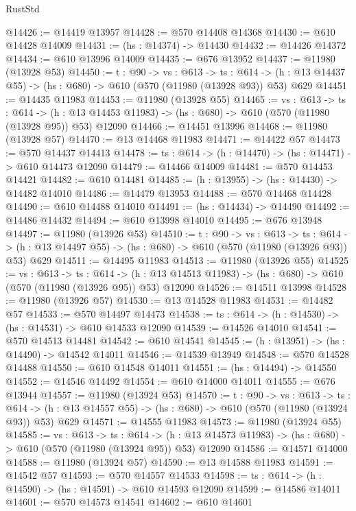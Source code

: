 \begin{lexlean}{RustStd}
\begin{coremodule}
@14426 := @14419 @13957
@14428 := @570 @14408 @14368
@14430 := @610 @14428 @14009
@14431 := (hs : @14374) -> @14430
@14432 := @14426 @14372
@14434 := @610 @13996 @14009
@14435 := @676 @13952
@14437 := @11980 (@13928 @53)
@14450 := {t : @90} ->
  {vs : @613} ->
  {ts : @614} -> (h : @13 @14437 @55) -> (hs : @680) -> @610 (@570 (@11980 (@13928 @93)) @53) @629
@14451 := @14435 @11983
@14453 := @11980 (@13928 @55)
@14465 := {vs : @613} ->
  {ts : @614} ->
  (h : @13 @14453 @11983) -> (hs : @680) -> @610 (@570 (@11980 (@13928 @95)) @53) @12090
@14466 := @14451 @13996
@14468 := @11980 (@13928 @57)
@14470 := @13 @14468 @11983
@14471 := @14422 @57
@14473 := @570 @14437 @14413
@14478 := {ts : @614} -> (h : @14470) -> (hs : @14471) -> @610 @14473 @12090
@14479 := @14466 @14009
@14481 := @570 @14453 @14421
@14482 := @610 @14481
@14485 := (h : @13955) -> (hs : @14430) -> @14482 @14010
@14486 := @14479 @13953
@14488 := @570 @14468 @14428
@14490 := @610 @14488 @14010
@14491 := (hs : @14434) -> @14490
@14492 := @14486 @14432
@14494 := @610 @13998 @14010
@14495 := @676 @13948
@14497 := @11980 (@13926 @53)
@14510 := {t : @90} ->
  {vs : @613} ->
  {ts : @614} -> (h : @13 @14497 @55) -> (hs : @680) -> @610 (@570 (@11980 (@13926 @93)) @53) @629
@14511 := @14495 @11983
@14513 := @11980 (@13926 @55)
@14525 := {vs : @613} ->
  {ts : @614} ->
  (h : @13 @14513 @11983) -> (hs : @680) -> @610 (@570 (@11980 (@13926 @95)) @53) @12090
@14526 := @14511 @13998
@14528 := @11980 (@13926 @57)
@14530 := @13 @14528 @11983
@14531 := @14482 @57
@14533 := @570 @14497 @14473
@14538 := {ts : @614} -> (h : @14530) -> (hs : @14531) -> @610 @14533 @12090
@14539 := @14526 @14010
@14541 := @570 @14513 @14481
@14542 := @610 @14541
@14545 := (h : @13951) -> (hs : @14490) -> @14542 @14011
@14546 := @14539 @13949
@14548 := @570 @14528 @14488
@14550 := @610 @14548 @14011
@14551 := (hs : @14494) -> @14550
@14552 := @14546 @14492
@14554 := @610 @14000 @14011
@14555 := @676 @13944
@14557 := @11980 (@13924 @53)
@14570 := {t : @90} ->
  {vs : @613} ->
  {ts : @614} -> (h : @13 @14557 @55) -> (hs : @680) -> @610 (@570 (@11980 (@13924 @93)) @53) @629
@14571 := @14555 @11983
@14573 := @11980 (@13924 @55)
@14585 := {vs : @613} ->
  {ts : @614} ->
  (h : @13 @14573 @11983) -> (hs : @680) -> @610 (@570 (@11980 (@13924 @95)) @53) @12090
@14586 := @14571 @14000
@14588 := @11980 (@13924 @57)
@14590 := @13 @14588 @11983
@14591 := @14542 @57
@14593 := @570 @14557 @14533
@14598 := {ts : @614} -> (h : @14590) -> (hs : @14591) -> @610 @14593 @12090
@14599 := @14586 @14011
@14601 := @570 @14573 @14541
@14602 := @610 @14601

\end{coremodule}
\end{lexlean}
